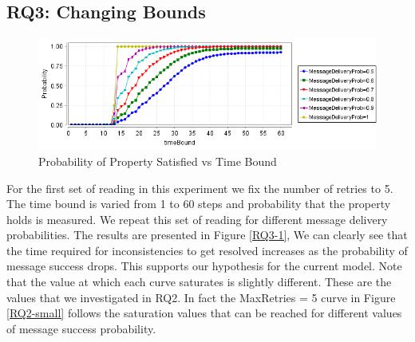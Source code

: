 \subsection{RQ3: Changing Bounds}

\begin{figure} 
  \includegraphics[width=\textwidth]{RQ3-1.png}
  \caption{Probability of Property Satisfied vs Time Bound}
  \label{RQ3-1l}
\end{figure}

For the first set of reading in this experiment we fix the number of retries to 5. The time bound is varied from 1 to 60 steps and probability that the property holds is measured. We repeat this set of reading for different message delivery probabilities. The results are presented in Figure \ref{RQ3-1}, We can clearly see that the time required for inconsistencies to get resolved increases as the probability of message success drops. This supports our hypothesis for the current model. Note that the value at which each curve saturates is slightly different. These are the values that we investigated in RQ2. In fact the MaxRetries = 5 curve in Figure \ref{RQ2-small} follows the saturation values that can be reached for different values of message success probability.